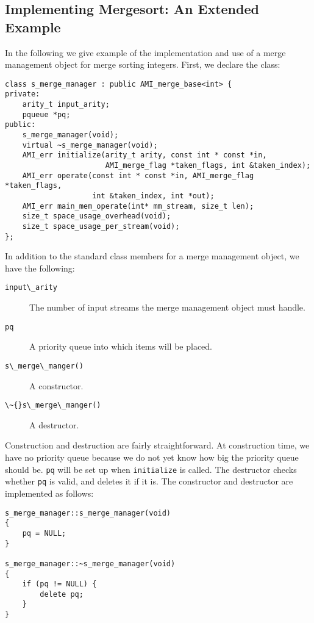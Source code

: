 \subsection{Implementing Mergesort: An Extended Example}
\label{sec:mergesort}

In the following we give example of the implementation and use of a merge
management object for merge sorting integers. First, we declare the class:


\begin{verbatim}
class s_merge_manager : public AMI_merge_base<int> { 
private:
    arity_t input_arity;
    pqueue *pq;
public:
    s_merge_manager(void);
    virtual ~s_merge_manager(void);
    AMI_err initialize(arity_t arity, const int * const *in,
                       AMI_merge_flag *taken_flags, int &taken_index);
    AMI_err operate(const int * const *in, AMI_merge_flag *taken_flags,
                    int &taken_index, int *out);
    AMI_err main_mem_operate(int* mm_stream, size_t len);
    size_t space_usage_overhead(void);
    size_t space_usage_per_stream(void);
};
\end{verbatim}

In addition to the standard class members for a merge management
object, we have the following:

\begin{description}
\item[\verb|input\_arity|]
The number of input streams the merge management object must handle.
\item[\verb|pq|]
A priority queue into which items will be placed.
\item[\verb|s\_merge\_manger()|]
A constructor.
\item[\verb|\~{}s\_merge\_manger()|]
A destructor.
\end{description}

Construction and destruction are fairly straightforward.  At construction
time, we have no priority queue because we do not yet know how big the
priority queue should be.  \verb|pq| will be set up when \verb|initialize|
is called.  The destructor checks whether
\verb|pq| is valid, and deletes it if it is.  The constructor and
destructor are implemented as follows:

\begin{verbatim}
s_merge_manager::s_merge_manager(void)
{
    pq = NULL;
}

s_merge_manager::~s_merge_manager(void)
{
    if (pq != NULL) {
        delete pq;
    }
}
\end{verbatim}

